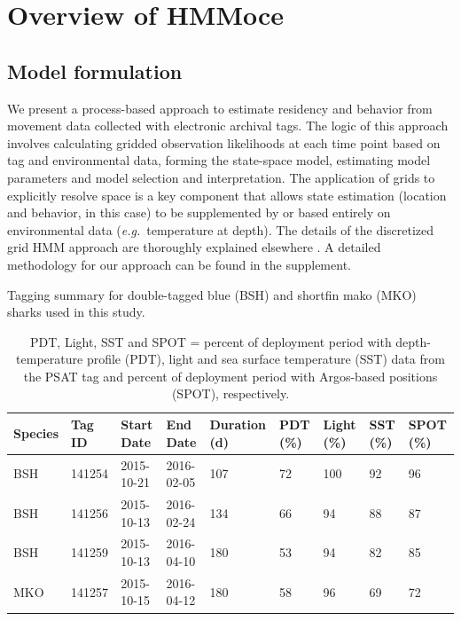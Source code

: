 \section{Overview of HMMoce}

\subsection{Model formulation}

We present a process-based approach to estimate residency and behavior
from movement data collected with electronic archival tags. The logic of
this approach involves calculating gridded observation likelihoods at
each time point based on tag and environmental data, forming the
state-space model, estimating model parameters and model selection and
interpretation. The application of grids to explicitly resolve space is
a key component that allows state estimation (location and behavior, in
this case) to be supplemented by or based entirely on environmental data
(\emph{e.g.}~temperature at depth). The details of the discretized grid HMM
approach are thoroughly explained elsewhere
\citep[\emph{e.g.}][]{Thygesen2009a, Pedersen2011}. A detailed methodology for
our approach can be found in the supplement.

\begin{table}[b] %
\centering
\caption[Satellite tagging summary for model data]{Tagging summary for double-tagged blue (BSH) and shortfin mako (MKO) sharks used in this study.}
\label{tab:c2t1}
\small
\begin{tabular}{p{1.25cm} p{1.25cm} p{2cm} p{2cm} p{1.5cm} p{1.25cm} p{1cm} p{1cm} p{1cm}}
\toprule
\textbf{Species} & \textbf{Tag ID} & \textbf{Start Date} & \textbf{End Date} & \textbf{Duration (d)} & \textbf{PDT (\%)} & \textbf{Light (\%)} & \textbf{SST (\%)} & \textbf{SPOT (\%)}\\
\midrule
BSH & 141254 & 2015-10-21 & 2016-02-05 & 107 & 72 & 100 & 92 & 96\\
BSH & 141256 & 2015-10-13 & 2016-02-24 & 134 & 66 & 94 & 88 & 87\\
BSH & 141259 & 2015-10-13 & 2016-04-10 & 180 & 53 & 94 & 82 & 85\\
MKO & 141257 & 2015-10-15 & 2016-04-12 & 180 & 58 & 96 & 69 & 72\\
\bottomrule
\end{tabular}
\caption*{PDT, Light, SST and SPOT = percent of deployment period with depth-temperature profile (PDT), light and sea surface temperature (SST) data from the PSAT tag and percent of deployment period with Argos-based positions (SPOT), respectively.}
\end{table}

